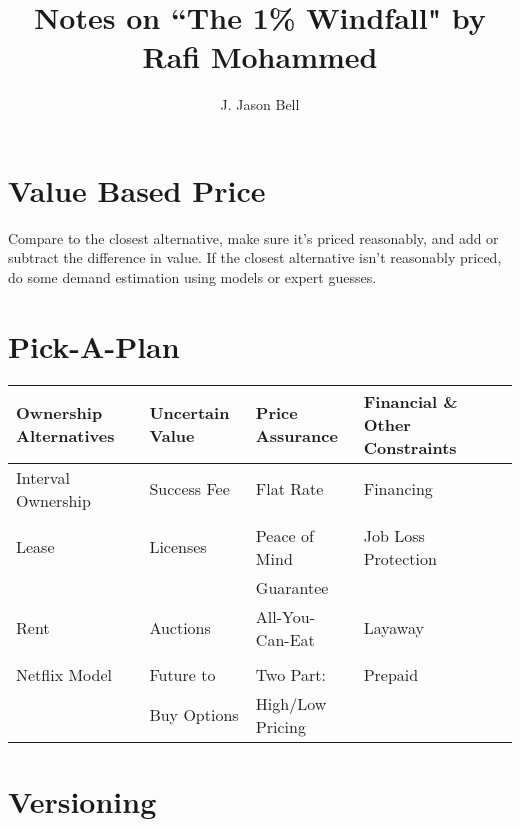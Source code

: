 \documentclass[11pt, oneside]{article}   	%
\title{Notes on ``The 1\% Windfall" by Rafi Mohammed}
\author{J. Jason Bell}
\begin{document}
 \maketitle
 
 \section{Value Based Price}
 Compare to the closest alternative, make sure it's priced reasonably, and add or subtract the difference in value.  If the closest alternative isn't reasonably priced, do some demand estimation using models or expert guesses.
 
 \section{Pick-A-Plan}
 
\begin{table}[ht]
\centering
\begin{tabular}{lllll}
  Ownership Alternatives 	& Uncertain Value 		& Price Assurance			& \hspace{2.5mm}Financial \& Other Constraints \\ 
  \hline
 Interval Ownership		& Success Fee 			& Flat Rate				& \hspace{2.5mm}Financing \\ 
 \\
\hline
 Lease 				& Licenses 			& Peace of Mind  			& \hspace{2.5mm}Job Loss Protection \\ 
 					&					&Guarantee \\
\hline
 Rent 				& Auctions 			& All-You-Can-Eat 			& \hspace{2.5mm}Layaway \\ 
 \\
\hline
 Netflix Model  			& Future to  			& Two Part: 			 	& \hspace{2.5mm}Prepaid \\ 
 					& Buy Options			& High/Low Pricing \\
   \hline
\end{tabular}
\end{table}

\vspace\baselineskip
\vspace\baselineskip
\vspace\baselineskip
\vspace\baselineskip
\vspace\baselineskip
\vspace\baselineskip
\vspace\baselineskip
\vspace\baselineskip
\vspace\baselineskip

 \section{Versioning}
 
\end{document}
